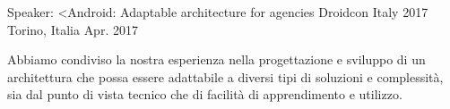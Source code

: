


\begin{cventries}


\cventry
{Speaker: <Android: Adaptable architecture for agencies} %
{Droidcon Italy 2017} %
{Torino, Italia} %
{Apr. 2017} %
{ %
	\begin{cvitems}
		\item {Abbiamo condiviso la nostra esperienza nella progettazione e sviluppo di un architettura che possa essere adattabile a diversi tipi di soluzioni e complessità, sia dal punto di vista tecnico che di facilità di apprendimento e utilizzo.}
	\end{cvitems}
}


\end{cventries}